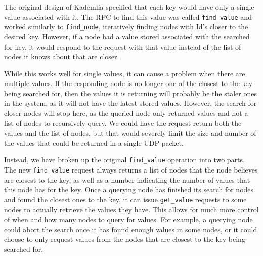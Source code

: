 \documentclass[conference]{IEEEtran}
\begin{document}
The original design of Kademlia specified that each key would have
only a single value associated with it. The RPC to find this value
was called \texttt{find\_value} and worked similarly to
\texttt{find\_node}, iteratively finding nodes with Id's closer to
the desired key. However, if a node had a value stored associated
with the searched for key, it would respond to the request with that
value instead of the list of nodes it knows about that are closer.

While this works well for single values, it can cause a problem when
there are multiple values. If the responding node is no longer one
of the closest to the key being searched for, then the values it is
returning will probably be the staler ones in the system, as it
will not have the latest stored values. However, the search for
closer nodes will stop here, as the queried node only returned
values and not a list of nodes to recursively query. We could have
the request return both the values and the list of nodes, but that
would severely limit the size and number of the values that could be
returned in a single UDP packet.

Instead, we have broken up the original \texttt{find\_value}
operation into two parts. The new \texttt{find\_value} request
always returns a list of nodes that the node believes are closest to
the key, as well as a number indicating the number of values that
this node has for the key. Once a querying node has finished its
search for nodes and found the closest ones to the key, it can issue
\texttt{get\_value} requests to some nodes to actually retrieve the
values they have. This allows for much more control of when and how
many nodes to query for values. For example, a querying node could
abort the search once it has found enough values in some nodes, or
it could choose to only request values from the nodes that are
closest to the key being searched for.
\end{document}
